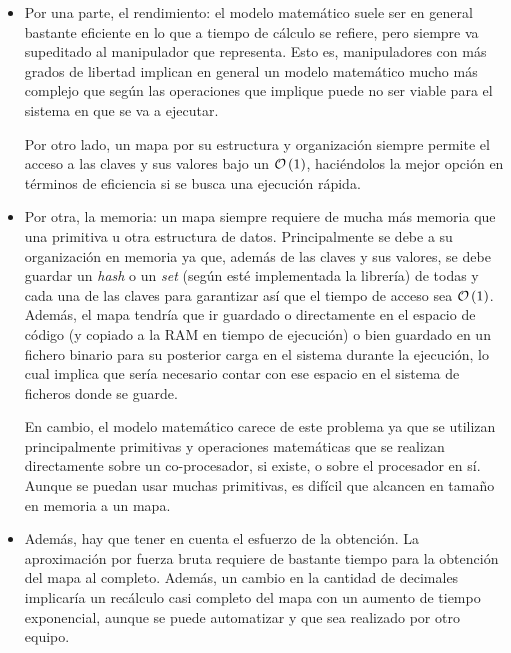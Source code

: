 \begin{itemize}
    \item Por una parte, el rendimiento: el modelo matemático suele ser en general
          bastante eficiente en lo que a tiempo de cálculo se refiere, pero siempre va
          supeditado al manipulador que representa. Esto es, manipuladores con más
          grados de libertad implican en general un modelo matemático mucho más complejo que según
          las operaciones que implique puede no ser viable para el sistema en que se va a ejecutar.

          Por otro lado, un mapa por su estructura y organización siempre permite el acceso a las
          claves y sus valores bajo un $\bigO{1}$, haciéndolos la mejor opción en términos
          de eficiencia si se busca una ejecución rápida.

    \item Por otra, la memoria: un mapa siempre requiere de mucha más memoria que
          una primitiva u otra estructura de datos. Principalmente se debe a su organización
          en memoria ya que, además de las claves y sus valores, se debe guardar un \textit{hash}
          o un \textit{set} (según esté implementada la librería) de todas y cada una de las
          claves para garantizar así que el tiempo de acceso sea $\bigO{1}$.
          Además, el mapa tendría que ir guardado o directamente en el espacio de código
          (y copiado a la \ac{RAM} en tiempo de ejecución) o bien guardado en un fichero
          binario para su posterior carga en el sistema durante la ejecución, lo cual implica
          que sería necesario contar con ese espacio en el sistema de ficheros donde se guarde.

          En cambio, el modelo matemático carece de este problema ya que se utilizan
          principalmente primitivas y operaciones matemáticas que se realizan directamente
          sobre un co-procesador, si existe, o sobre el procesador en sí. Aunque se puedan
          usar muchas primitivas, es difícil que alcancen en tamaño en memoria a un mapa.

    \item Además, hay que tener en cuenta el esfuerzo de la obtención. La aproximación
          por fuerza bruta requiere de bastante tiempo para la obtención del mapa al completo.
          Además, un cambio en la cantidad de decimales implicaría un recálculo casi completo del mapa
          con un aumento de tiempo exponencial, aunque se puede automatizar y que sea realizado
          por otro equipo.


\end{itemize}
